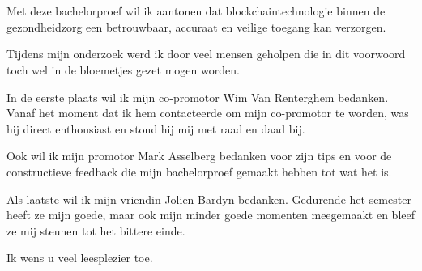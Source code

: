 
\chapter*{}
\label{ch:voorwoord}

Met deze bachelorproef wil ik aantonen dat blockchaintechnologie binnen de gezondheidzorg een betrouwbaar, accuraat en veilige toegang kan verzorgen.

Tijdens mijn onderzoek werd ik door veel mensen geholpen die in dit voorwoord toch wel in de bloemetjes gezet mogen worden.

In de eerste plaats wil ik mijn co-promotor Wim Van Renterghem bedanken. Vanaf het moment dat ik hem contacteerde om mijn co-promotor te worden, was hij direct enthousiast en stond hij mij met raad en daad bij.

Ook wil ik mijn promotor Mark Asselberg bedanken voor zijn tips en voor de constructieve feedback die mijn bachelorproef gemaakt hebben tot wat het is.

Als laatste wil ik mijn vriendin Jolien Bardyn bedanken. Gedurende het semester heeft ze mijn goede, maar ook mijn minder goede momenten meegemaakt en bleef ze mij steunen tot het bittere einde.

Ik wens u veel leesplezier toe.

